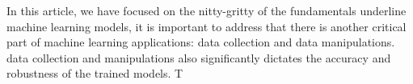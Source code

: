 In this article, we have focused on the nitty-gritty of the fundamentals underline machine learning models, it is important to address that there is another critical part of machine learning applications: data collection and data manipulations. data collection and manipulations also significantly dictates the accuracy and robustness of the trained models. T